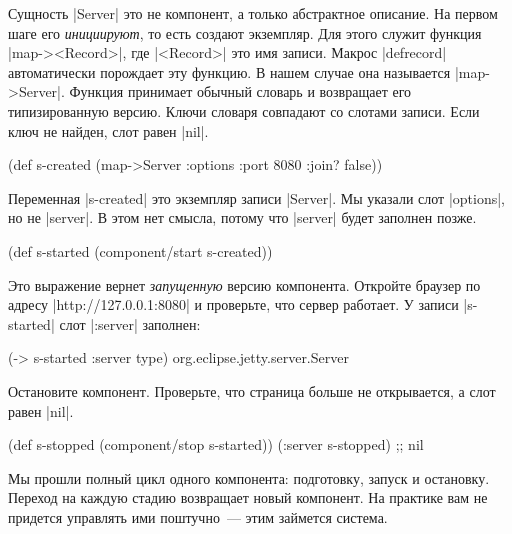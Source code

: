 Сущность \spverb|Server| это не компонент, а только абстрактное описание. На
первом шаге его \emph{инициируют}, то есть создают экземпляр. Для этого служит
функция \spverb|map-><Record>|, где \spverb|<Record>| это имя записи. Макрос
\spverb|defrecord| автоматически порождает эту функцию. В нашем случае она
называется \spverb|map->Server|. Функция принимает обычный словарь и возвращает
его типизированную версию. Ключи словаря совпадают со слотами записи. Если ключ
не найден, слот равен \spverb|nil|.

\begin{english}
  \begin{clojure}
(def s-created
  (map->Server
   {:options {:port 8080 :join? false}}))
  \end{clojure}
\end{english}

Переменная \spverb|s-created| это экземпляр записи \spverb|Server|. Мы указали
слот \spverb|options|, но не \spverb|server|. В этом нет смысла, потому что
\spverb|server| будет заполнен позже.

\begin{english}
  \begin{clojure}
(def s-started (component/start s-created))
  \end{clojure}
\end{english}

Это выражение вернет \emph{запущенную} версию компонента. Откройте браузер по
адресу \spverb|http://127.0.0.1:8080| и проверьте, что сервер работает. У записи
\spverb|s-started| слот \spverb|:server| заполнен:

\begin{english}
  \begin{clojure}
(-> s-started :server type)
org.eclipse.jetty.server.Server
  \end{clojure}
\end{english}

Остановите компонент. Проверьте, что страница больше не открывается, а слот
равен \spverb|nil|.

\begin{english}
  \begin{clojure}
(def s-stopped (component/stop s-started))
(:server s-stopped) ;; nil
  \end{clojure}
\end{english}

Мы прошли полный цикл одного компонента: подготовку, запуск и остановку. Переход
на каждую стадию возвращает новый компонент. На практике вам не придется
управлять ими поштучно~--- этим займется система.

